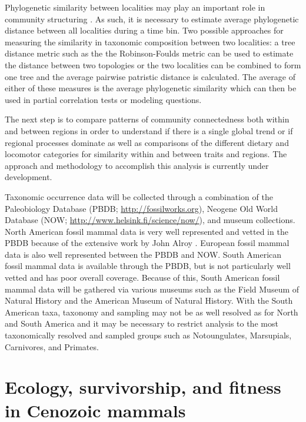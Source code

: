 \documentclass[12pt,letterpaper]{article}
\begin{document}
Phylogenetic similarity between localities may play an important role in community structuring \citep{Webb2002}. As such, it is necessary to estimate average phylogenetic distance between all localities during a time bin. Two possible approaches for measuring the similarity in taxonomic composition between two localities: a tree distance metric such as the the Robinson-Foulds metric \citep{Robinson1981} can be used to estimate the distance between two topologies or the two localities can be combined to form one tree and the average pairwise patristic distance \citep{Sokal1962} is calculated. The average of either of these measures is the average phylogenetic similarity which can then be used in partial correlation tests or modeling questions.

The next step is to compare patterns of community connectedness both within and between regions in order to understand if there is a single global trend or if regional processes dominate as well as comparisons of the different dietary and locomotor categories for similarity within and between traits and regions. The approach and methodology to accomplish this analysis is currently under development. 

Taxonomic occurrence data will be collected through a combination of the Paleobiology Database (PBDB; \url{http://fossilworks.org}), Neogene Old World Database (NOW; \url{http://www.helsink.fi/science/now/}), and museum collections. North American fossil mammal data is very well represented and vetted in the PBDB because of the extensive work by John Alroy \citep{Alroy1996a,Alroy1998,Alroy2000g}. European fossil mammal data is also well represented between the PBDB and NOW. South American fossil mammal data is available through the PBDB, but is not particularly well vetted and has poor overall coverage. Because of this, South American fossil mammal data will be gathered via various museums such as the Field Museum of Natural History and the American Museum of Natural History. With the South American taxa, taxonomy and sampling may not be as well resolved as for North and South America and it may be necessary to restrict analysis to the most taxonomically resolved and sampled groups such as Notoungulates, Marsupials, Carnivores, and Primates.


\section{Ecology, survivorship, and fitness in Cenozoic mammals}
\end{document}

